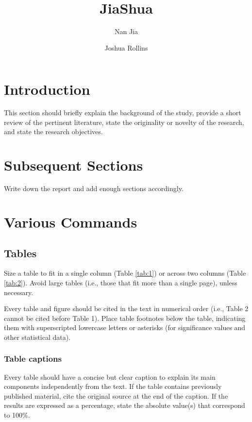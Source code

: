 \documentclass[twocolumn]{sintr}
\title{JiaShua}
\author{Nan Jia}
\author{Joshua Rollins}
\affil[1]{The graduate center, CUNY}
\affil[$\mbox{*}$]{Corresponding author: \href{mailto:sjena@iisermohali.ac.in}{sjena@iisermohali.ac.in}}
\begin{document}
\setcounter{page}{1}
\maketitle

\thispagestyle{firststyle}

\section{Introduction}

This section should briefly explain the background of the study, provide a short review of the pertinent literature, state the originality or novelty of the research, and state the research objectives.

\section{Subsequent Sections}

Write down the report and add enough sections accordingly.

\section{Various Commands}
\subsection{Tables}

Size a table to fit in a single column (Table \ref{tab:1}) or across two columns (Table \ref{tab:2}). Avoid large tables (i.e., those that fit more than a single page), unless necessary.

Every table and figure should be cited in the text in numerical order (i.e., Table 2 cannot be cited before Table 1). Place table footnotes below the table, indicating them with superscripted lowercase letters or asterisks (for significance values and other statistical data).

%
%
%

\subsubsection{Table captions}
Every table should have a concise but clear caption to explain its main components independently from the text. If the table contains previously published material, cite the original source at the end of the caption. If the results are expressed as a percentage, state the absolute value(s) that correspond to 100\%.
\end{document}
